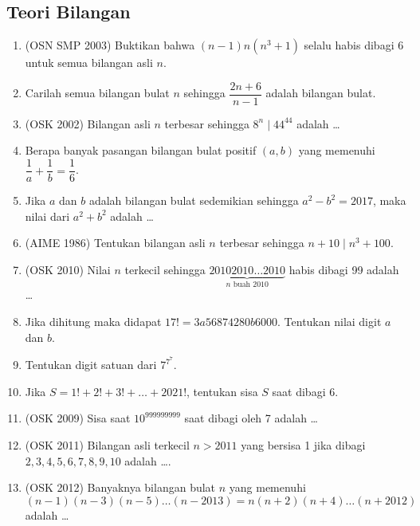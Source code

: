 \documentclass[11pt]{scrartcl}
\begin{document}
    \subsection{Teori Bilangan}
        \begin{enumerate}
          \item (OSN SMP 2003) Buktikan bahwa $(n-1)n(n^3+1)$ selalu habis dibagi 6 untuk semua bilangan asli $n$.
            
            \item Carilah semua bilangan bulat $n$ sehingga $\dfrac{2n+6}{n-1}$ adalah bilangan bulat.
            
            \item (OSK 2002) Bilangan asli $n$ terbesar sehingga $8^n \mid 44^{44}$ adalah \dots
            
            \item Berapa banyak pasangan bilangan bulat positif $(a,b)$ yang memenuhi $\dfrac{1}{a}+\dfrac{1}{b}=\dfrac{1}{6}$.
            
            \item Jika $a$ dan $b$ adalah bilangan bulat sedemikian sehingga $a^2-b^2=2017$, maka nilai dari $a^2+b^2$ adalah \dots
            
            \item (AIME 1986) Tentukan bilangan asli $n$ terbesar sehingga $n+10 \mid n^3+100$.
            
            \item (OSK 2010) Nilai $n$ terkecil sehingga $\underbrace{20102010\dots2010}_\text{$n$ buah 2010}$ habis dibagi 99 adalah \dots
            
            \item Jika dihitung maka didapat $17! = 3a56874280b6000$. Tentukan nilai digit $a$ dan $b$.
            
            \item Tentukan digit satuan dari $7^{7^7}$.
            
            \item Jika $S=1!+2!+3!+\dots+2021!$, tentukan sisa $S$ saat dibagi 6.
            
            \item (OSK 2009) Sisa saat $10^{999999999}$ saat dibagi oleh 7 adalah \dots
            \item (OSK 2011) Bilangan asli terkecil $n>2011$ yang bersisa 1 jika dibagi $2,3,4,5,6,7,8,9,10$ adalah \dots.
            \item (OSK 2012) Banyaknya bilangan bulat $n$ yang memenuhi $$(n-1)(n-3)(n-5)\dots(n-2013)=n(n+2)(n+4)\dots (n+2012)$$ adalah \dots
            

\end{enumerate}
\end{document}
